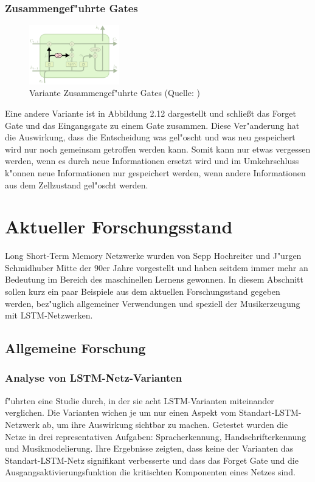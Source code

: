 {\subsubsection{Zusammengef"uhrte Gates}
\begin{figure}
  \vspace{-40pt}
  \begin{center}
    \includegraphics[width=0.35\textwidth]{pictures/LSTM3-var-tied_cut.png}
  \end{center}
  \vspace{-20pt}
  \caption[LSTM Variante: Zusammengef"uhrte Gates]{Variante Zusammengef"uhrte Gates (Quelle: \cite{OlahImg})}
\vspace{-10pt}
\end{figure}
Eine andere Variante ist in Abbildung 2.12 dargestellt und schlie{\ss}t das Forget Gate und das Eingangsgate zu einem Gate zusammen. Diese Ver"anderung hat die Auswirkung, dass die Entscheidung was gel"oscht und was neu gespeichert wird nur noch gemeinsam getroffen werden kann. Somit kann nur etwas vergessen werden, wenn es durch neue Informationen ersetzt wird und im Umkehrschluss k"onnen neue Informationen nur gespeichert werden, wenn andere Informationen aus dem Zellzustand gel"oscht werden.


\section{Aktueller Forschungsstand}
Long Short-Term Memory Netzwerke wurden von Sepp Hochreiter und J"urgen Schmidhuber Mitte der 90er Jahre vorgestellt und haben seitdem immer mehr an Bedeutung im Bereich des maschinellen Lernens gewonnen. In diesem Abschnitt sollen kurz ein paar Beispiele aus dem aktuellen Forschungsstand gegeben werden, bez"uglich allgemeiner Verwendungen und speziell der Musikerzeugung mit LSTM-Netzwerken.

\subsection{Allgemeine Forschung}

\subsubsection{Analyse von LSTM-Netz-Varianten}
\cite{SpaceOdyssey} f"uhrten eine Studie durch, in der sie acht LSTM-Varianten miteinander verglichen. Die Varianten wichen je um nur einen Aspekt vom Standart-LSTM-Netzwerk ab, um ihre Auswirkung sichtbar zu machen. Getestet wurden die Netze in drei representativen Aufgaben: Spracherkennung, Handschrifterkennung und Musikmodelierung. Ihre Ergebnisse zeigten, dass keine der Varianten das Standart-LSTM-Netz signifikant verbesserte und dass das Forget Gate und die Ausgangsaktivierungsfunktion die kritischten Komponenten eines Netzes sind.

}
